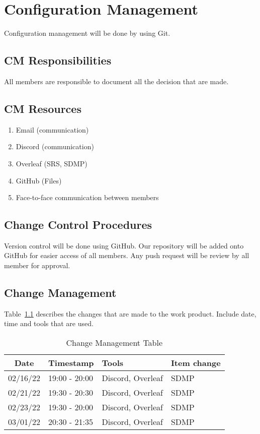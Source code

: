 \documentclass[letterpaper,12pt,oneside,listof=totoc]{scrreprt}
\begin{document}
\chapter{Configuration Management}
Configuration management will be done by using Git. 

\section{CM Responsibilities}
All members are responsible to document all the decision that are made. 

\section{CM Resources}
\begin{enumerate} 
\item Email (communication)
\item Discord (communication)
\item Overleaf (SRS, SDMP)
\item GitHub (Files)
\item Face-to-face communication between members
\end{enumerate}

\section{Change Control Procedures}
Version control will be done using GitHub. Our repository will be added onto GitHub for easier access of all members. Any push request will be review by all member for approval.


\section{Change Management}

Table~\ref{ChangeM} describes the changes that are made to the work product. Include date, time and tools that are used. 

\begin{table}[h!]
\centering
\begin{tabular}{| c | p{}| p{}| p{} |}
\hline
Date     & Timestamp & Tools  & Item change \\
\hline
02/16/22 & 19:00 - 20:00 & Discord, Overleaf & SDMP \\
\hline
02/21/22 & 19:30 - 20:30 & Discord, Overleaf & SDMP \\
\hline
02/23/22 & 19:30 - 20:00 & Discord, Overleaf & SDMP \\
\hline
03/01/22 & 20:30 - 21:35 & Discord, Overleaf & SDMP \\
\hline
\end{tabular}
\caption{Change Management Table}
\label{ChangeM}
\end{table}
\end{document}
